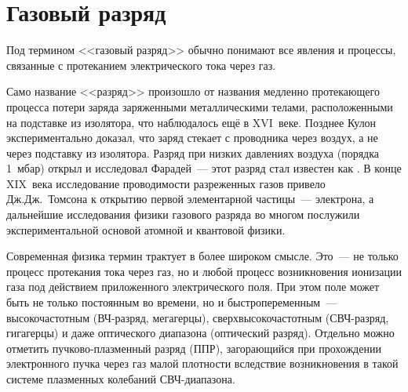 \labsupplement

\section*{Газовый разряд}\label{sec:discharge}

Под термином <<газовый разряд>> обычно понимают все явления и процессы,
связанные с протеканием электрического тока через газ.

Само название <<разряд>> произошло от названия медленно протекающего
процесса потери заряда заряженными металлическими телами,
расположенными на подставке из изолятора, что наблюдалось ещё в
XVI~веке. Позднее Кулон экспериментально доказал, что заряд стекает
с проводника через воздух, а не через подставку из изолятора.
Разряд при низких давлениях воздуха (порядка 1~мбар) открыл и исследовал
Фарадей~--- этот разряд стал известен как . В конце XIX~века
исследование проводимости разреженных газов привело Дж.Дж.~Томсона к
открытию первой элементарной частицы~--- электрона, а дальнейшие исследования
физики газового разряда во многом послужили экспериментальной основой
атомной и квантовой физики.


Современная физика термин  трактует в более широком
смысле. Это~--- не только процесс протекания тока через газ, но и любой процесс
возникновения ионизации газа под действием приложенного электрического поля.
При этом поле может быть не только постоянным во времени,
но и быстропеременным~--- высокочастотным (ВЧ-разряд, мегагерцы),
сверхвысокочастотным (СВЧ-разряд, гигагерцы) и даже оптического диапазона
(оптический разряд). Отдельно можно отметить пучково-плазменный разряд (ППР),
загорающийся при прохождении электронного пучка через газ малой плотности
вследствие возникновения в такой системе плазменных колебаний СВЧ-диапазона.

